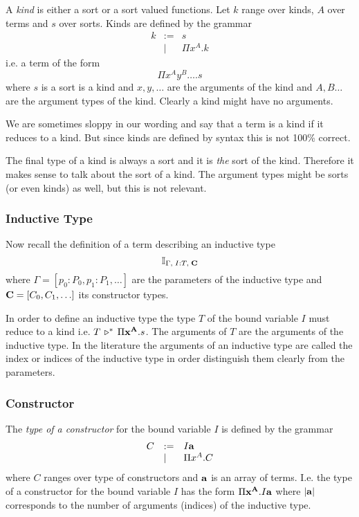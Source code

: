 \begin{definition}
  A \emph{kind} is either a sort or a sort valued functions. Let $k$ range
  over kinds, $A$ over terms and $s$ over sorts. Kinds are defined by the
  grammar
  $$
  \begin{array}{lll}
    k
    &:=& s
    \\
    &\mid& \Pi x^A. k
  \end{array}
  $$
  i.e. a term of the form
  $$
  \Pi x^A y^B \ldots . s
  $$
  where $s$ is a sort is a kind and $x, y, \ldots$ are the arguments of the
  kind and $A, B \ldots$ are the argument types of the kind. Clearly a kind
  might have no arguments.

  We are sometimes sloppy in our wording and say that a term is a kind if it
  reduces to a kind. But since kinds are defined by syntax this is not 100\%
  correct.

  The final type of a kind is always a sort and it is \emph{the} sort of the
  kind. Therefore it makes sense to talk about the sort of a kind. The
  argument types might be sorts (or even kinds) as well, but this is not
  relevant.
\end{definition}



\subsubsection{Inductive Type}

Now recall the definition of a term describing an inductive type
$$
\mathbb{I}_{\Gamma, \; I:T, \; \mathbf{C}}
$$
where $\Gamma = [p_0:P_0, p_1: P_1, \ldots]$ are the parameters of the
inductive type and $\mathbf{C} = [C_0, C_1, \ldots]$ its constructor types.

In order to define an inductive type the type $T$ of the bound variable $I$
must reduce to a kind i.e. $T \,\triangleright^*\, \Pi \mathbf{x}^{\mathbf{A}}. s$. The arguments
of $T$ are the arguments of the inductive type. In the literature the
arguments of an inductive type are called the index or indices of the
inductive type in order distinguish them clearly from the parameters.


\subsubsection{Constructor}

\begin{definition}
  The \emph{type of a constructor} for the bound variable $I$ is defined by
  the grammar
  $$
  \begin{array}{lll}
    C
    &:= & I \mathbf{a}
    \\
    &\mid& \Pi x^A . C
  \end{array}
  $$
  where $C$ ranges over type of constructors and $\mathbf{a}$ is an array of
  terms. I.e. the type of a constructor for the bound variable $I$ has the
  form $\Pi \mathbf{x}^{\mathbf{A}}. I \mathbf{a}$ where $|\mathbf{a}|$ corresponds to the
  number of arguments (indices) of the inductive type.
\end{definition}

